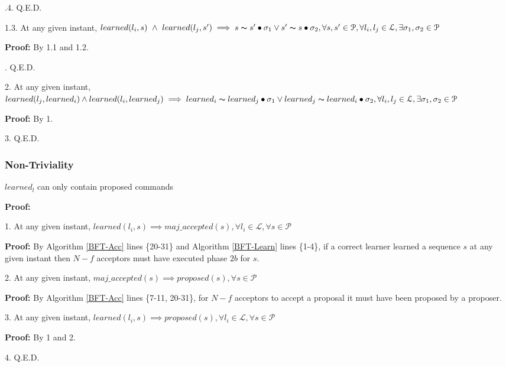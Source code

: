 \indent\indent\indent\indent{}.4. Q.E.D. \par
\indent\indent\indent \parbox{\linewidth}{1.3. At any given instant, $learned(l_i,s)\ \land\ learned(l_j,s') \implies s \thicksim s' \bullet \sigma_1 \lor s' \thicksim s \bullet \sigma_2, \forall s,s' \in \mathcal{P}, \forall l_i,l_j \in \mathcal{L}, \exists \sigma_1,\sigma_2 \in \mathcal{P}$ }\par
\indent\indent\indent\indent\textbf{Proof:} By 1.1 and 1.2.\par
\indent\indent{}. Q.E.D. \par
\parbox{\linewidth}{2. At any given instant, $learned(l_j,learned_i) \land learned(l_i,learned_j) \implies learned_i \thicksim learned_j \bullet \sigma_1 \lor learned_j \thicksim learned_i \bullet \sigma_2, \forall l_i,l_j \in \mathcal{L}, \exists \sigma_1,\sigma_2 \in \mathcal{P}$}\par
\indent\indent\textbf{Proof:} By 1.\par
3. Q.E.D. \par

\subsubsection{Non-Triviality}
\begin{theorem}
$learned_l$ can only contain proposed commands \label{N-T1} \par
\end{theorem} 
\textbf{Proof:} \par
1. At any given instant, $learned(l_i,s) \implies maj\_accepted(s),\forall l_i \in \mathcal{L}, \forall s \in \mathcal{P}$ \par
\indent\indent\parbox{\linewidth}{\textbf{Proof:} By Algorithm \ref{BFT-Acc} lines \{20-31\} and Algorithm \ref{BFT-Learn} lines \{1-4\}, if a correct learner learned a sequence $s$ at any given instant then $N-f$ acceptors must have executed phase $2b$ for $s$.}\par
2. At any given instant, $maj\_accepted(s) \implies proposed(s), \forall s \in \mathcal{P}$ \par
\indent\indent\parbox{\linewidth}{\textbf{Proof:} By Algorithm \ref{BFT-Acc} lines \{7-11, 20-31\}, for $N-f$ acceptors to accept a proposal it must have been proposed by a proposer.}\par
3. At any given instant, $learned(l_i,s) \implies proposed(s),\forall l_i \in \mathcal{L}, \forall s \in \mathcal{P}$ \par
\indent\indent\textbf{Proof:} By 1 and 2. \par
4. Q.E.D. \par

